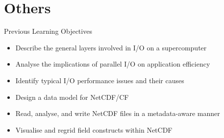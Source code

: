 \documentclass[compress,11pt,xcolor=svgnames,aspectratio=169]{beamer}
\begin{document}
\section{Others}

\begin{frame}[t]{Previous Learning Objectives}

\begin{itemize}

    \item Describe the general layers involved in I/O on a supercomputer
    \item Analyse the implications of parallel I/O on application efficiency
    \item Identify typical I/O performance issues and their causes
    \item Design a data model for NetCDF/CF
    \item Read, analyse, and write NetCDF files in a metadata-aware manner
    \item Visualise and regrid field constructs within NetCDF

\end{itemize}

\end{frame}

\acknowledgement
\end{document}
